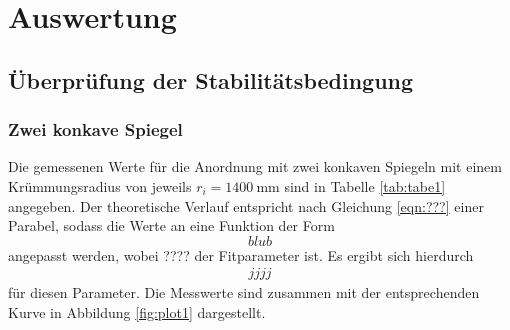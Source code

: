 \section{Auswertung}
\label{sec:Auswertung}



\subsection{Überprüfung der Stabilitätsbedingung}

\subsubsection{Zwei konkave Spiegel}
Die gemessenen Werte für die Anordnung mit zwei konkaven Spiegeln mit einem
Krümmungsradius von jeweils $r_i = \SI{1400}{\milli\meter}$ sind in Tabelle \ref{tab:tabe1}
angegeben. Der theoretische Verlauf entspricht nach Gleichung \ref{eqn:???} einer Parabel,
sodass die Werte an eine Funktion der Form
\begin{equation}
  blub
\end{equation}
angepasst werden, wobei ???? der Fitparameter ist.
Es ergibt sich hierdurch
\begin{align*}
 jjjj
\end{align*}
für diesen Parameter. Die Messwerte sind zusammen mit der
entsprechenden Kurve in Abbildung \ref{fig:plot1} dargestellt.

\begin{minipage}{0.5\textwidth}

\end{minipage}
\begin{minipage}{0.2\textwidth}

\end{minipage}


